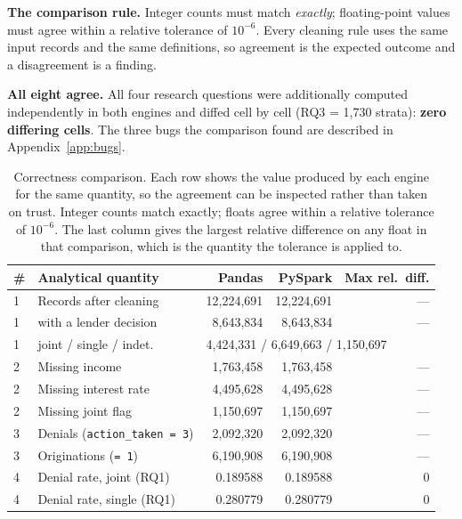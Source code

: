 \documentclass[sigconf,balance=false]{acmart}
\begin{document}
\textbf{The comparison rule.} Integer counts must match \emph{exactly};
floating-point values must agree within a relative tolerance of $10^{-6}$.
Every cleaning rule uses the same input records and the same definitions, so
agreement is the expected outcome and a disagreement is a finding.

\textbf{All eight agree.} All four research questions were additionally
computed independently in both engines and diffed cell by cell
(RQ3 = 1{,}730 strata): \textbf{zero differing cells}. The three bugs the
comparison found are described in Appendix~\ref{app:bugs}.

\begin{table}[t]
\caption{Correctness comparison. Each row shows the value produced by each
         engine for the same quantity, so the agreement can be inspected
         rather than taken on trust. Integer counts match exactly; floats
         agree within a relative tolerance of $10^{-6}$. The last column
         gives the largest relative difference on any float in that
         comparison, which is the quantity the tolerance is applied to.}
\label{tab:equiv}
\centering
\scriptsize
\setlength{\tabcolsep}{3pt}
\begin{tabular}{@{}llrrr@{}}
\toprule
\# & Analytical quantity & Pandas & PySpark & Max rel.\ diff. \\
\midrule
1 & Records after cleaning            & 12{,}224{,}691 & 12{,}224{,}691 & --- \\
1 & \quad with a lender decision       & 8{,}643{,}834  & 8{,}643{,}834  & --- \\
1 & \quad joint / single / indet.
  & \multicolumn{3}{l}{4{,}424{,}331 / 6{,}649{,}663 / 1{,}150{,}697} \\
2 & Missing income                    & 1{,}763{,}458 & 1{,}763{,}458 & --- \\
2 & Missing interest rate             & 4{,}495{,}628 & 4{,}495{,}628 & --- \\
2 & Missing joint flag                & 1{,}150{,}697 & 1{,}150{,}697 & --- \\
3 & Denials (\texttt{action\_\allowbreak taken = 3}) & 2{,}092{,}320 & 2{,}092{,}320 & --- \\
3 & Originations (\texttt{= 1})        & 6{,}190{,}908  & 6{,}190{,}908  & --- \\
4 & Denial rate, joint (RQ1)           & 0.189588 & 0.189588 & $0$ \\
4 & Denial rate, single (RQ1)          & 0.280779 & 0.280779 & $0$ \\

\end{tabular}
\end{table}
\end{document}
